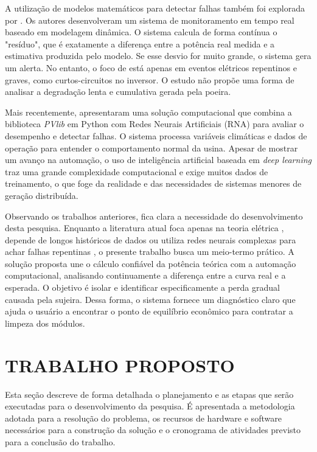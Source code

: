 \documentclass{UNESC}
\begin{document}
A utilização de modelos matemáticos para detectar falhas também foi explorada por . Os autores desenvolveram um sistema de monitoramento em tempo real baseado em modelagem dinâmica. O sistema calcula de forma contínua o "resíduo", que é exatamente a diferença entre a potência real medida e a estimativa produzida pelo modelo. Se esse desvio for muito grande, o sistema gera um alerta. No entanto, o foco de  está apenas em eventos elétricos repentinos e graves, como curtos-circuitos no inversor. O estudo não propõe uma forma de analisar a degradação lenta e cumulativa gerada pela poeira.

Mais recentemente,  apresentaram uma solução computacional que combina a biblioteca \textit{PVlib} em Python com Redes Neurais Artificiais (RNA) para avaliar o desempenho e detectar falhas. O sistema processa variáveis climáticas e dados de operação para entender o comportamento normal da usina. Apesar de mostrar um avanço na automação, o uso de inteligência artificial baseada em \textit{deep learning} traz uma grande complexidade computacional e exige muitos dados de treinamento, o que foge da realidade e das necessidades de sistemas menores de geração distribuída.

Observando os trabalhos anteriores, fica clara a necessidade do desenvolvimento desta pesquisa. Enquanto a literatura atual foca apenas na teoria elétrica \cite{fernandez2022estimation}, depende de longos históricos de dados \cite{kalimeris2023data} ou utiliza redes neurais complexas para achar falhas repentinas \cite{salazar2024ai, lazzaretti2020monitoring}, o presente trabalho busca um meio-termo prático. A solução proposta une o cálculo confiável da potência teórica com a automação computacional, analisando continuamente a diferença entre a curva real e a esperada. O objetivo é isolar e identificar especificamente a perda gradual causada pela sujeira. Dessa forma, o sistema fornece um diagnóstico claro que ajuda o usuário a encontrar o ponto de equilíbrio econômico para contratar a limpeza dos módulos.


\section{TRABALHO PROPOSTO}
Esta seção descreve de forma detalhada o planejamento e as etapas que serão executadas para o desenvolvimento da pesquisa. É apresentada a metodologia adotada para a resolução do problema, os recursos de hardware e software necessários para a construção da solução e o cronograma de atividades previsto para a conclusão do trabalho.
\end{document}
